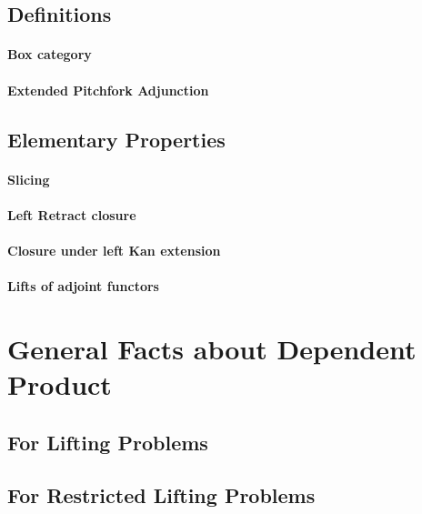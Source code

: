 \documentclass[reqno,10pt,a4paper,oneside]{amsart}
\begin{document}
\subsection{Definitions}

\paragraph{Box category}

\paragraph{Extended Pitchfork Adjunction}

\subsection{Elementary Properties}

\paragraph{Slicing}

\paragraph{Left Retract closure}

\paragraph{Closure under left Kan extension}

\paragraph{Lifts of adjoint functors}

\section{General Facts about Dependent Product}

\subsection{For Lifting Problems}

\subsection{For Restricted Lifting Problems}
\end{document}
